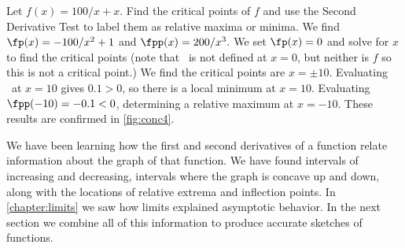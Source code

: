 \begin{example}\label{ex_conc4}
Let $f(x)=100/x + x$.  Find the critical points of $f$ and use the Second Derivative Test to label them as relative maxima or minima.
\solution
%
%
We find $\fp(x)=-100/x^2+1$ and $\fpp(x) = 200/x^3.$  We set $\fp(x)=0$ and solve for $x$ to find the critical points (note that \fp\ is not defined at $x=0$, but neither is $f$ so this is not a critical point.) We find  the critical points are $x=\pm 10$.  Evaluating \fpp\ at $x=10$ gives $0.1>0$, so there is a local minimum at $x=10$.  Evaluating $\fpp(-10)=-0.1<0$, determining a relative maximum at  $x=-10$. These results are confirmed in \autoref{fig:conc4}.
\end{example}

We have been learning how the first and second derivatives of a function relate information about the graph of that function. We have found intervals of increasing and decreasing, intervals where the graph is concave up and down, along with the locations of relative extrema and inflection points. In \autoref{chapter:limits} we saw how limits explained asymptotic behavior. In the next section we combine all of this information to produce accurate sketches of functions.



